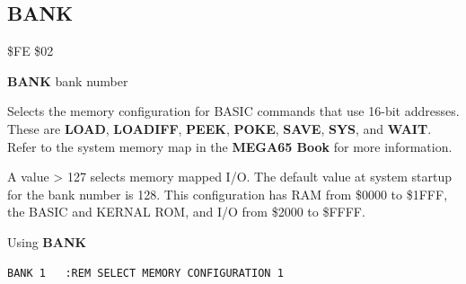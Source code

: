 
\newpage
\subsection{BANK}
\label{BASIC 65 Commands!BANK}
\begin{description}[leftmargin=2cm,style=nextline]
\item [Token:] \$FE \$02
\item [Format:] {\bf BANK} bank number
\item [Usage:] Selects the memory configuration
               for BASIC commands that use 16-bit addresses.
               These are {\bf LOAD}, {\bf LOADIFF}, {\bf PEEK}, {\bf POKE}, {\bf SAVE}, {\bf SYS}, and {\bf WAIT}.
               Refer to the system memory map in
\ifdefined\printmanual
the {\bf MEGA65 Book}
\else
{}
\fi
for more information.
\item [Remarks:] A value > 127 selects memory mapped I/O.
                 The default value at system startup for the bank number is 128.
                 This configuration has RAM from \$0000 to \$1FFF,
                 the BASIC and KERNAL ROM, and I/O from \$2000 to \$FFFF.
\item [Example:] Using {\bf BANK}
\begin{tcolorbox}[colback=black,coltext=white]
\verbatimfont{\codefont}
\begin{verbatim}
BANK 1   :REM SELECT MEMORY CONFIGURATION 1
\end{verbatim}
\end{tcolorbox}
\end{description}


\newpage
